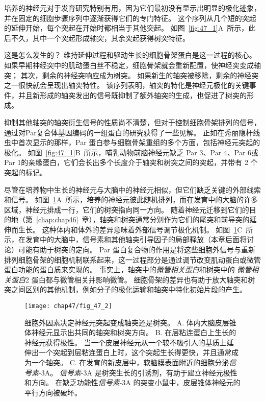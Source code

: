 培养的神经元对于发育研究特别有用，因为它们最初没有显示出明显的极化迹象，并在固定的细胞步骤序列中逐渐获得它们的专门特征。
这个序列从几个短的突起的延伸开始，每个突起在开始时都相当于其他突起。
如图~\ref{fig:47_1}A~所示，此后不久，其中一个突起形成轴突，其余突起获得树突特征。


这是怎么发生的？
维持延伸过程和驱动生长的细胞骨架蛋白是这一过程的核心。
如果早期神经突中的肌动蛋白丝不稳定，细胞骨架就会重新配置，使神经突变成轴突；
其次，剩余的神经突响应成为树突。
如果新生的轴突被移除，剩余的神经突之一很快就会呈现出轴突特性。
该序列表明，轴突的特化是神经元极化的关键事件，并且新形成的轴突发出的信号既抑制了额外轴突的生成，也促进了树突的形成。


抑制其他轴突的轴突衍生信号的性质尚不清楚，但对于控制细胞骨架排列的信号，通过对Par复合体基因编码的一组蛋白的研究获得了一些见解。
正如在秀丽隐杆线虫中首次显示的那样，Par 蛋白参与细胞骨架重组的多个方面，包括神经元突起的极化。
如图~\ref{fig:47_1}B~所示，哺乳动物前脑神经元缺乏 Par 3、Par 4、Par 6或Par 1的亲缘蛋白，它们会长出多个长度介于轴突和树突之间的突起，并带有 2 个突起的标记。


尽管在培养物中生长的神经元与大脑中的神经元相似，但它们缺乏关键的外部线索和信号。
如图~\ref{fig:47_2}A~所示，培养的神经元彼此随机排列，而在发育中的大脑的许多区域，神经元排成一行，它们的树突指向同一方向。
随着神经元迁移到它们的目的地（第~\ref{chap:chap46}~章），轴突和树突通常分别作为它们的尾突和前导突的延伸而生长。
这种体内和体外的差异意味着外部信号调节极化机制。
如图~\ref{fig:47_2}C~所示，在发育中的大脑中，信号素和其他轴突引导因子的局部释放（本章后面将讨论）可能有助于树突的定向。
Par 蛋白复合物的作用是将这些细胞外信号与重新排列细胞骨架的细胞机制联系起来，这一过程部分是通过调节改变肌动蛋白或微管蛋白功能的蛋白质来实现的。
事实上，轴突中的\textit{微管相关蛋白}和树突中的 \textit{微管相关蛋白}2 蛋白都与微管相关并影响微管。
细胞骨架的差异也有助于放大轴突和树突之间区别的其他机制，例如分子的极化运输和轴突中特化初始片段的产生。


\begin{figure}[htbp]
	\centering
	\texttt{[image: chap47/fig\_47\_2]}
	\caption{细胞外因素决定神经元突起变成轴突还是树突。
		A. 体内大脑皮层锥体神经元显示出共同的轴突和树突方向。
		B. 在层粘连蛋白上生长的神经元获得极性。
		当一个皮层神经元从一个较不吸引人的基质上延伸出一个突起到层粘连蛋白上时，这个突起生长得更快，并且通常成为一个轴突。
		C. 在发育的新皮层中，软脑膜表面附近的细胞分泌\textit{信号素}-3A。
		\textit{信号素}-3A 是树突生长的引诱剂，有助于建立神经元极性和方向。
		在缺乏功能性\textit{信号素}-3A 的突变小鼠中，皮层锥体神经元的平行方向被破坏。}
	\label{fig:47_2}
\end{figure}


